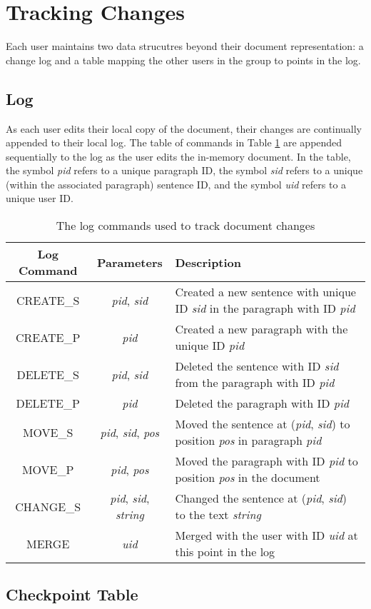 \section{Tracking Changes}

Each user maintains two data strucutres beyond their document
representation: a change log and a table mapping the other users in 
the group to points in the log. 


\subsection{Log}
As each user edits their local copy of the document, their changes
are continually appended to their local log. The table of commands in
Table \ref{table:log_commands} are appended sequentially to the log as the user edits the in-memory
document. In the table, the symbol \emph{pid} refers to a unique paragraph ID, the symbol \emph{sid}
refers to a unique (within the associated paragraph) sentence ID, and the symbol \emph{uid} refers
to a unique user ID.

\begin{table}[h!]
\begin{center}
 \begin{tabular} {|c|c|p{7cm}|}
  \hline
  Log Command & Parameters & Description \\
  \hline \hline
  CREATE\_S & \emph{pid}, \emph{sid} & Created a new sentence with unique ID \emph{sid} in the paragraph with ID \emph{pid} \\
  \hline
  CREATE\_P & \emph{pid} & Created a new paragraph with the unique ID \emph{pid} \\
  \hline
  DELETE\_S & \emph{pid}, \emph{sid} & Deleted the sentence with ID \emph{sid} from the paragraph with ID \emph{pid} \\
  \hline
  DELETE\_P & \emph{pid} & Deleted the paragraph with ID \emph{pid} \\
  \hline
  MOVE\_S & \emph{pid}, \emph{sid}, \emph{pos} & Moved the sentence at (\emph{pid}, \emph{sid}) to position \emph{pos} in paragraph \emph{pid} \\
  \hline
  MOVE\_P & \emph{pid}, \emph{pos} & Moved the paragraph with ID \emph{pid} to position \emph{pos} in the document \\ 
  \hline
  CHANGE\_S & \emph{pid}, \emph{sid}, \emph{string} & Changed the sentence at (\emph{pid}, \emph{sid}) to the text \emph{string} \\
  \hline
  MERGE & \emph{uid} & Merged with the user with ID \emph{uid} at this point in the log \\
  \hline
 \end{tabular}
\end{center}
\caption{The log commands used to track document changes}
\label{table:log_commands}
\end{table}

\subsection{Checkpoint Table}


